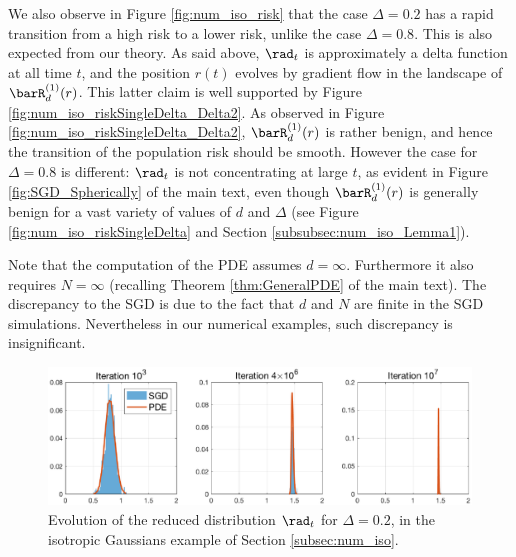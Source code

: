 \documentclass[11pt]{article}
\begin{document}
We also observe in Figure \ref{fig:num_iso_risk} that the case $\Delta=0.2$ has a rapid transition from a high risk to a lower risk, unlike the case $\Delta=0.8$. This is also expected from our theory. As said above, $\rad_t$ is approximately a delta function at all time $t$, and the position $r(t)$ evolves by gradient flow in the landscape of $\barR^{(1)}_d(r)$. This latter claim is well supported by Figure \ref{fig:num_iso_riskSingleDelta_Delta2}. As observed in Figure \ref{fig:num_iso_riskSingleDelta_Delta2}, $\barR^{(1)}_d(r)$ is rather benign, and hence the transition of the population risk should be smooth. However the case for $\Delta=0.8$ is different: $\rad_t$ is not concentrating at large $t$, as evident in Figure \ref{fig:SGD_Spherically} of the main text, even though $\barR^{(1)}_d(r)$ is generally benign for a vast variety of values of $d$ and $\Delta$ (see Figure \ref{fig:num_iso_riskSingleDelta} and Section \ref{subsubsec:num_iso_Lemma1}).

Note that the computation of the PDE assumes $d=\infty$. Furthermore it also requires $N=\infty$ (recalling Theorem \ref{thm:GeneralPDE} of the main text). The discrepancy to the SGD is due to the fact that $d$ and $N$ are finite in the SGD simulations. Nevertheless in our numerical examples, such discrepancy is insignificant.

\begin{figure}[]
	\begin{center}
		\includegraphics[width=1.0\textwidth]{isoPDE_flatSigmoid_rhist_Delta2_step10_initW8.eps}
	\end{center}
	\caption{Evolution of the reduced distribution $\rad_t$ for $\Delta=0.2$, in the isotropic Gaussians example of Section \ref{subsec:num_iso}.}
	\label{fig:num_iso_rhist_Delta2}
\end{figure}
\end{document}

